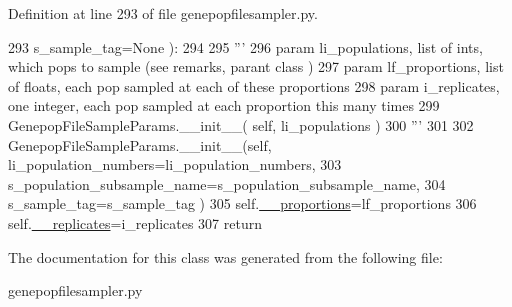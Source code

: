 Definition at line 293 of file genepopfilesampler.\+py.


\begin{DoxyCode}
293             s\_sample\_tag=\textcolor{keywordtype}{None} ):
294 
295         \textcolor{stringliteral}{'''}
296 \textcolor{stringliteral}{        param li\_populations, list of ints, which pops to sample (see remarks, parant class )}
297 \textcolor{stringliteral}{        param lf\_proportions, list of floats, each pop sampled at each of these proportions}
298 \textcolor{stringliteral}{        param i\_replicates, one integer, each pop sampled at each proportion this many times}
299 \textcolor{stringliteral}{        GenepopFileSampleParams.\_\_init\_\_( self, li\_populations )}
300 \textcolor{stringliteral}{        '''}
301 
302         GenepopFileSampleParams.\_\_init\_\_(self, li\_population\_numbers=li\_population\_numbers, 
303                                             s\_population\_subsample\_name=s\_population\_subsample\_name,
304                                             s\_sample\_tag=s\_sample\_tag )
305         self.\hyperlink{classnegui_1_1genepopfilesampler_1_1GenepopFileSampleParamsProportion_aa8dd8cef783da4e9bdb7c550e56382fd}{\_\_proportions}=lf\_proportions
306         self.\hyperlink{classnegui_1_1genepopfilesampler_1_1GenepopFileSampleParamsProportion_abebe5fb2092cd292a8d15269cb30bc33}{\_\_replicates}=i\_replicates
307         \textcolor{keywordflow}{return}
\end{DoxyCode}


The documentation for this class was generated from the following file\+:\begin{DoxyCompactItemize}
\item 
genepopfilesampler.\+py\end{DoxyCompactItemize}
